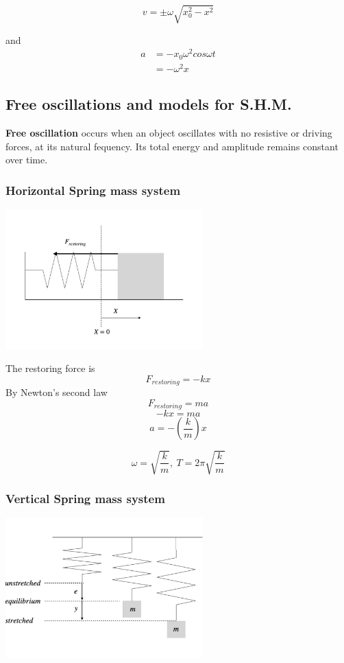 \documentclass[a4paper, 10pt]{article}
\begin{document}
\[
   v = \pm \omega \sqrt{x_0^2 - x^2}
\]

and
\begin{align*}
   a &= -x_0 \omega^2 cos \omega t \\
     &= -\omega^2 x
\end{align*}	

\subsection{Free oscillations and models for S.H.M.}

\textbf{Free oscillation} occurs when an object oscillates with no resistive or driving forces, at its natural fequency. Its total energy and amplitude remains constant over time. \\

\subsubsection{Horizontal Spring mass system}
\begin{center}
\includegraphics[trim = 50 50 50 50, width=3in]{figures/1.pdf} 
\end{center}	
The restoring force is
\[
   F_{restoring} = -kx
\]
By Newton's second law  
\[
   F_{restoring} = ma
\]
\[
-kx = ma
\]
\[
   a = -\left( \frac{k}{m}\right) x
\]

\[
   \omega = \sqrt{\frac{k}{m}},\ T = 2\pi\sqrt{\frac{k}{m}}
\]

\subsubsection{Vertical Spring mass system}
\begin{center}
\includegraphics[trim = 50 50 50 50, width=3in]{figures/2.pdf} 
\end{center}	
\end{document}
